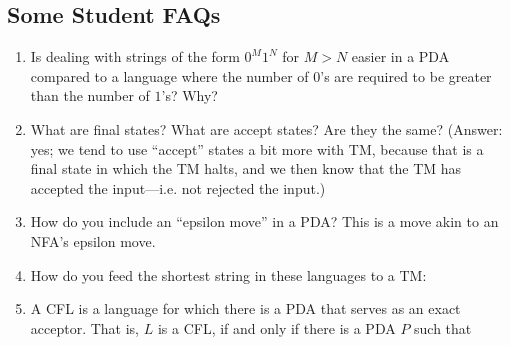 \documentclass[12pt]{article}
\begin{document}
\begin{large}
  
\section{Some Student FAQs}


\begin{enumerate}

\item Is dealing with strings of the form $0^M 1^N$ for $M>N$ easier in a PDA compared to a language
  where the number of $0$'s are required to be greater than the number of $1$'s? Why?

\item What are final states? What are accept states? Are they the
  same? (Answer: yes; we tend to use ``accept'' states a bit more
  with TM, because that is a final state in which the TM halts,
  and we then know that the TM has accepted the input---i.e.
  not rejected the input.)
  
\item How do you include an ``epsilon move'' in a PDA? This
  is a move akin to an NFA's epsilon move.

\item How do you feed the shortest string in these languages
  to a TM:

\item A CFL is a language for which there is a PDA that serves
  as an exact acceptor.
  That is, $L$ is a CFL, if and only if there is a PDA $P$
  such that


\end{enumerate}
\end{large}
\end{document}
